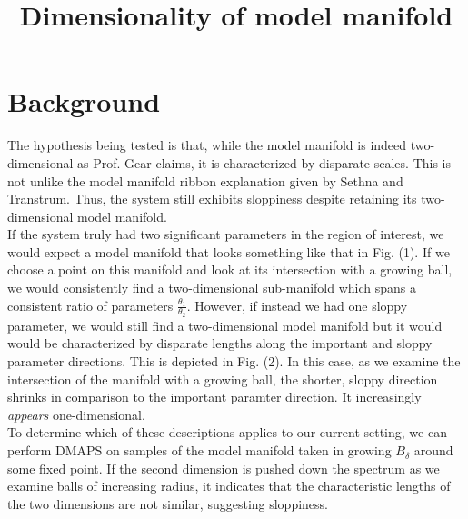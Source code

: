 \documentclass[11pt]{article}
\title{Dimensionality of model manifold}
\begin{document}
\maketitle

\section{Background}

The hypothesis being tested is that, while the model manifold is
indeed two-dimensional as Prof. Gear claims, it is characterized by
disparate scales. This is not unlike the model manifold ribbon
explanation given by Sethna and Transtrum. Thus, the system still
exhibits sloppiness despite retaining its two-dimensional model
manifold. \\

If the system truly had two significant parameters in the region of
interest, we would expect a model manifold that looks something like
that in Fig. (1). If we choose a point on this manifold and look at
its intersection with a growing ball, we would consistently find a
two-dimensional sub-manifold which spans a consistent ratio of
parameters $\frac{\theta_1}{\theta_2}$. However, if instead we had one
sloppy parameter, we would still find a two-dimensional model manifold
but it would would be characterized by disparate lengths along the
important and sloppy parameter directions. This is depicted in
Fig. (2). In this case, as we examine the intersection of the manifold
with a growing ball, the shorter, sloppy direction shrinks in
comparison to the important paramter direction. It increasingly
\textit{appears} one-dimensional. \\

To determine which of these descriptions applies to our current
setting, we can perform DMAPS on samples of the model manifold taken
in growing $B_\delta$ around some fixed point. If the second dimension
is pushed down the spectrum as we examine balls of increasing radius,
it indicates that the characteristic lengths of the two dimensions are
not similar, suggesting sloppiness. \\
\end{document}
